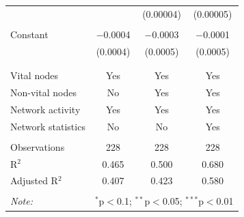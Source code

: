 \begin{table}[!htbp]
\begin{tabular}{@{\extracolsep{5pt}}lccc}
  &  & (0.00004) & (0.00005) \\ 
  & & & \\ 
 Constant & $-$0.0004 & $-$0.0003 & $-$0.0001 \\ 
  & (0.0004) & (0.0005) & (0.0005) \\ 
  & & & \\ 
\hline \\[-1.8ex] 
Vital nodes & Yes & Yes & Yes \\ 
Non-vital nodes & No & Yes & Yes \\ 
Network activity & Yes & Yes & Yes \\ 
Network statistics & No & No & Yes \\ 
\hline &  &  &  \\ 
Observations & 228 & 228 & 228 \\ 
R$^{2}$ & 0.465 & 0.500 & 0.680 \\ 
Adjusted R$^{2}$ & 0.407 & 0.423 & 0.580 \\ 
\hline 
\hline \\[-1.8ex] 
\textit{Note:}  & \multicolumn{3}{r}{$^{*}$p$<$0.1; $^{**}$p$<$0.05; $^{***}$p$<$0.01} \\ 
\end{tabular} 
\end{table} 
